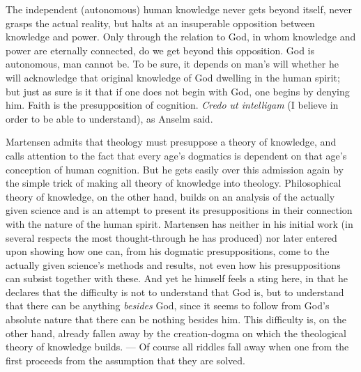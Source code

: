 \documentclass[12pt,a4paper]{book}
\newcommand{\opage}[1]{\marginnote{\footnotesize\textit{[#1]}}}
\begin{document}
The independent (autonomous) human knowledge never gets beyond itself, never grasps the actual
reality, but halts at an insuperable opposition between knowledge and power. Only through the
relation to God, in whom knowledge and power are eternally connected, do we get beyond this
opposition. God is autonomous, man cannot be. To be sure, it depends on man's will whether he will
acknowledge that original knowledge of God dwelling in the human spirit; but just as sure is it
that if one does not begin with God, one begins by denying him. Faith is the presupposition of
cognition. \emph{Credo ut intelligam} (I believe in order to be able to understand), as Anselm
said.

Martensen admits that theology must presuppose a theory of knowledge, and calls attention to the
fact that every age's dogmatics is dependent on that age's conception of human cognition. But he
gets easily over this admission again by the simple trick of making all theory of knowledge into
theology. Philosophical theory of knowledge, on the other hand, builds on an analysis of the
actually given science and is an attempt to present its presuppositions in their connection with
the nature of the human spirit. Martensen has neither in his initial work (in several respects
the most thought-through he has produced) nor later entered upon showing how one can, from his
dogmatic presuppositions, come to the actually given science's methods and results, not even how
his presuppositions can subsist together with these. And yet he himself feels a sting here, in
that he declares that the difficulty is not to understand that God is, but to understand that
there can be \opage{139}anything \emph{besides} God, since it seems to follow from God's absolute nature that
there can be nothing besides him. This difficulty is, on the other hand, already fallen away by
the creation-dogma on which the theological theory of knowledge builds. --- Of course all riddles
fall away when one from the first proceeds from the assumption that they are solved.
\end{document}
